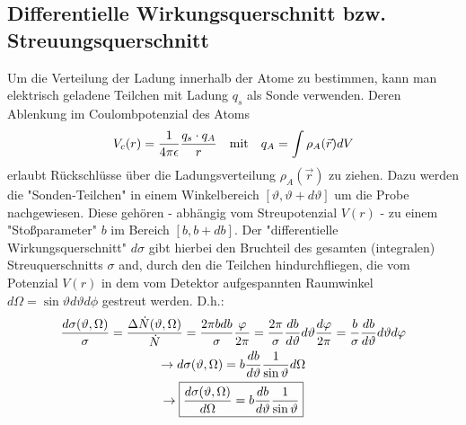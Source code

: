 \subsection{Differentielle Wirkungsquerschnitt bzw. Streuungsquerschnitt} %
\label{sub:Differentielle_Wirkungsquerschnitt_bzw._Streuungsquerschnitt}
Um die Verteilung der Ladung innerhalb der Atome zu bestimmen, kann man
elektrisch geladene Teilchen mit Ladung $q_s$ als Sonde verwenden. Deren
Ablenkung im Coulombpotenzial des Atoms
\begin{equation*}
    V_c (r) = \frac{1}{4\pi\epsilon}\frac{q_s \cdot q_A}{r} 
    \quad
    \text{mit} 
    \quad
    q_A = \int \rho_A (\vec{r}) dV
\end{equation*}
erlaubt Rückschlüsse über die Ladungsverteilung $\rho_A (\vec{r})$ zu ziehen.
Dazu werden die "Sonden-Teilchen" in einem Winkelbereich $\left[ \vartheta, \vartheta
+ d \vartheta \right]$ um die Probe nachgewiesen. Diese gehören - abhängig vom
Streupotenzial $V(r)$ - zu einem "Stoßparameter" $b$ im Bereich $\left[ b, b+db
\right]$. 
Der "differentielle Wirkungsquerschnitt" $d \sigma$ gibt hierbei den Bruchteil
des gesamten (integralen) Streuquerschnitts $\sigma$ and, durch den die
Teilchen hindurchfliegen, die vom Potenzial $V(r)$ in dem vom Detektor
aufgespannten Raumwinkel $d \Omega = \sin \vartheta d \vartheta d\phi$
gestreut werden. D.h.:
\begin{gather*}
    \frac{d \sigma (\vartheta,\Omega)}{\sigma}
    =
    \frac{\Delta \dot{N}(\vartheta,\Omega)}{\dot{N}}
    =
    \frac{2 \pi b db}{\sigma} \frac{\varphi}{2\pi}
    =
    \frac{2\pi}{\sigma} \frac{db}{d\vartheta}d\vartheta \frac{d \varphi}{2 \pi}
    =
    \frac{b}{\sigma} \frac{db}{d\vartheta}d\vartheta d\varphi \\
    \rightarrow d\sigma(\vartheta,\Omega) = b \frac{d b}{d \vartheta} \frac{1}{\sin
    \vartheta} d\Omega \\
    \rightarrow
    \boxed{
    \frac{d \sigma (\vartheta,\Omega)}{d \Omega} = b \frac{d b}{d \vartheta}
    \frac{1}{\sin \vartheta}
    }
\end{gather*}
